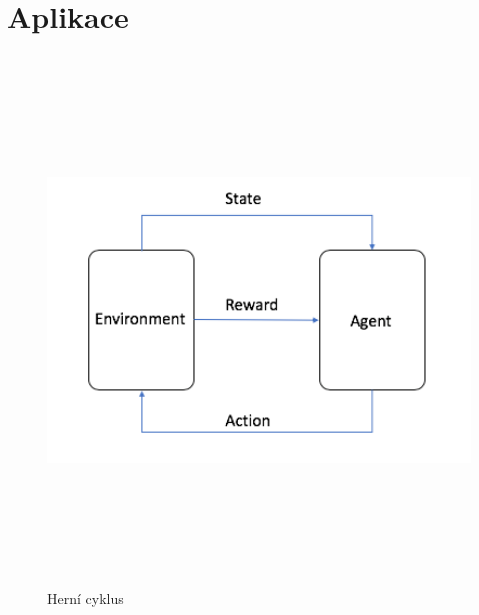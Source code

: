 \section{Aplikace}





\begin{figure}[p]\centering
\includegraphics[width=140mm, height=140mm]{./agent_enviroment}
\caption{Herní cyklus}
\label{obr03:Nhust}
\end{figure}

